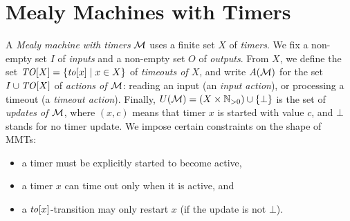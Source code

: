 %


\chapter{Mealy Machines with Timers}

A \emph{Mealy machine with timers} \(\mathcal{M}\) uses a finite set $X$ of
\emph{timers}.  We fix a non-empty set \(I\) of \emph{inputs} and a non-empty
set \(O\) of \emph{outputs}.
From  
\(X\),  
we define the set
\(\mathit{TO}[X] = \{\mathit{to}[x] \mid x \in X\}\) of \emph{timeouts of \(X\)}, and
write \({A({\mathcal{M}})}\) for the set \(I \cup \mathit{TO}[X]\) of \emph{actions of
\(\mathcal{M}\)}: 
reading an input (an \emph{input action}),
or processing a timeout (a \emph{timeout action}).
Finally, \({U({\mathcal{M}})} = (X \times {\mathbb N}_{>0}) \cup \{\bot\}\) is the set of
\emph{updates of \(\mathcal{M}\)}, where $(x, c)$ means that timer $x$ is started with
value $c$, and $\bot$ stands for no timer update.
We impose certain
constraints on the shape of 
MMTs:
\begin{itemize}
  \item a timer must be explicitly started to become active,
  \item a timer \(x\) can time out only when it is active, and
  \item a \(\mathit{to}[x]\)-transition may only restart \(x\) (if the update is
not \(\bot\)).
\end{itemize}

